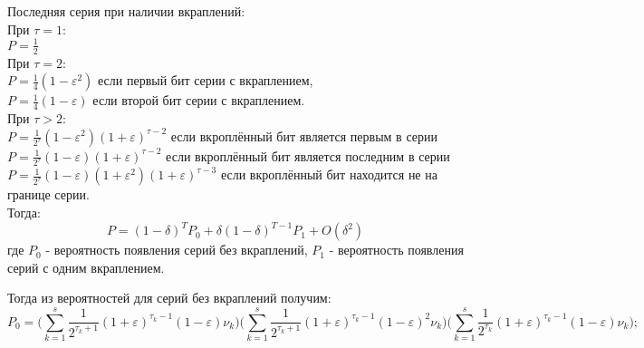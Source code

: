 \documentclass[a4paper,12pt]{article}
\theoremstyle{plain}
\begin{document}
Последняя серия при наличии вкраплений:\\
При $\tau=1$:\\
$P=\frac{1}{2}$\\
При $\tau=2$:\\
$P=\frac{1}{4}(1-\varepsilon^2)$  если первый бит серии с вкраплением,\\
$P=\frac{1}{4}(1-\varepsilon)$  если второй бит серии с вкраплением.\\
При $\tau>2$:\\
$P=\frac{1}{2^\tau}(1-\varepsilon^2)(1+\varepsilon)^{\tau-2}$ если вкроплённый бит является первым в серии\\
$P=\frac{1}{2^\tau}(1-\varepsilon)(1+\varepsilon)^{\tau-2}$ если вкроплённый бит является последним в серии\\
$P=\frac{1}{2^\tau}(1-\varepsilon)(1+\varepsilon^2)(1+\varepsilon)^{\tau-3}$ если вкроплённый бит находится не на границе серии.\\
Тогда:
\begin{equation}
P=(1-\delta)^TP_0+\delta(1-\delta)^{T-1}P_1+O(\delta^2)
\end{equation}
где $P_0$ - вероятность появления серий без вкраплений,  $P_1$ - вероятность появления серий с одним вкраплением.

Тогда из вероятностей для серий без вкраплений получим:\\
\begin{equation}
 P_0=\biggl(\sum_{k=1}^s\frac{1}{2^{\tau_k+1}}(1+\varepsilon)^{\tau_k-1}(1-\varepsilon)\nu_k\biggr)\biggl(\sum_{k=1}^s\frac{1}{2^{\tau_k+1}}(1+\varepsilon)^{\tau_k-1}(1-\varepsilon)^2\nu_k\biggr)\biggl(\sum_{k=1}^s\frac{1}{2^{\tau_k}}(1+\varepsilon)^{\tau_k-1}(1-\varepsilon)\nu_k\biggr);
\end{equation}


 
\end{document}
